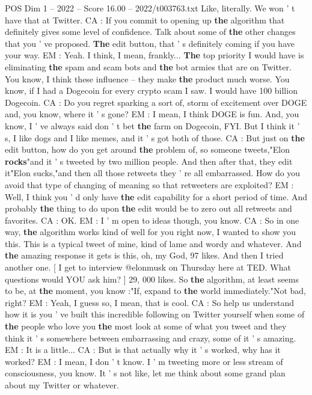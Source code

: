 \begin{textsample}{POS Dim 1 – 2022 – Score 16.00 – 2022/t003763.txt}
Like, literally.
We won ' t have that at Twitter.
CA : If you commit to opening up \textbf{the} algorithm that definitely gives some level of confidence.
Talk about some of \textbf{the} other changes that you ' ve proposed. \textbf{The} edit button, that ' s definitely coming if you have your way.
EM : Yeah.
I think, I mean, frankly... \textbf{The} top priority I would have is eliminating \textbf{the} spam and scam bots and \textbf{the} bot armies that are on Twitter.
You know, I think these influence -- they make \textbf{the} product much worse.
You know, if I had a Dogecoin for every crypto scam I saw.
I would have 100 billion Dogecoin.
CA : Do you regret sparking a sort of, storm of excitement over DOGE and, you know, where it ' s gone?
EM : I mean, I think DOGE is fun.
And, you know, I ' ve always said don ' t bet \textbf{the} farm on Dogecoin, FYI.
But I think it ' s, I like dogs and I like memes, and it ' s got both of those.
CA : But just on \textbf{the} edit button, how do you get around \textbf{the} problem of, so someone tweets,"Elon \textbf{rocks}"and it ' s tweeted by two million people.
And then after that, they edit it"Elon sucks,"and then all those retweets they ' re all embarrassed.
How do you avoid that type of changing of meaning so that retweeters are exploited?
EM : Well, I think you ' d only have \textbf{the} edit capability for a short period of time.
And probably \textbf{the} thing to do upon \textbf{the} edit would be to zero out all retweets and favorites.
CA : OK.
EM : I ' m open to ideas though, you know.
CA : So in one way, \textbf{the} algorithm works kind of well for you right now, I wanted to show you this.
This is a typical tweet of mine, kind of lame and wordy and whatever.
And \textbf{the} amazing response it gets is this, oh, my God, 97 likes.
And then I tried another one. [ I get to interview @elonmusk on Thursday here at TED.
What questions would YOU ask him? ] 29, 000 likes.
So \textbf{the} algorithm, at least seems to be, at \textbf{the} moment, you know :"If, expand to \textbf{the} world immediately."Not bad, right?
EM : Yeah, I guess so, I mean, that is cool.
CA : So help us understand how it is you ' ve built this incredible following on Twitter yourself when some of \textbf{the} people who love you \textbf{the} most look at some of what you tweet and they think it ' s somewhere between embarrassing and crazy, some of it ' s amazing.
EM : It is a little...
CA : But is that actually why it ' s worked, why has it worked?
EM : I mean, I don ' t know.
I ' m tweeting more or less stream of consciousness, you know.
It ' s not like, let me think about some grand plan about my Twitter or whatever.

\end{textsample}
